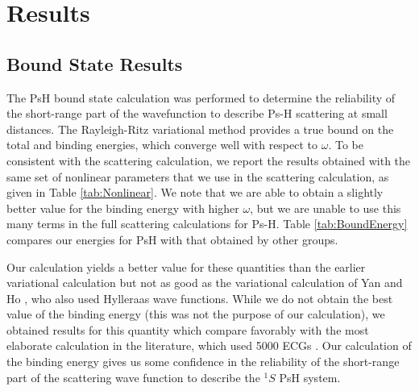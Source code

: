\documentclass[reprint,showpacs,preprintnumbers,amsmath,amssymb,pra,aps]{revtex4-1}
\begin{document}
\section{Results}
\label{sec:Results}

\subsection{Bound State Results}

The PsH bound state calculation was performed to determine the reliability of the short-range part of the wavefunction to describe Ps-H scattering at small distances. The Rayleigh-Ritz variational method provides a true bound on the total and binding energies, which converge well with respect to $\omega$. To be consistent with the scattering calculation, we report the results obtained with the same set of nonlinear parameters that we use in the scattering calculation, as given in Table \ref{tab:Nonlinear}. We note that we are able to obtain a slightly better value for the binding energy with higher $\omega$, but we are unable to use this many terms in the full scattering calculations for Ps-H. Table \ref{tab:BoundEnergy} compares our energies for PsH with that obtained by other groups.

Our calculation yields a better value for these
quantities than the earlier variational calculation \cite{VanReeth2003,VanReeth2004}
but not as good as the variational calculation of
Yan and Ho \cite{Yan1999}, who also used Hylleraas wave functions.
While we do not obtain the best value of the binding energy
(this was not the purpose of our calculation),
we obtained results for this quantity which compare favorably with
the most elaborate calculation in the literature, which
used 5000 ECGs \cite{Bubin2006}.
Our calculation of the binding energy gives us some confidence
in the reliability of the short-range part of the
scattering wave function to describe
the $^1S$ PsH system.
\end{document}
